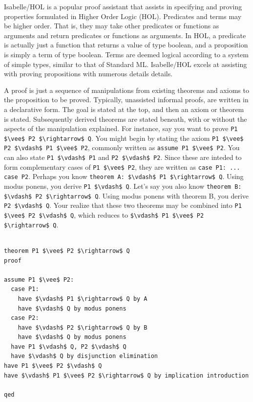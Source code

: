 \documentclass[letterpaper, 11pt]{extarticle}
\begin{document}
Isabelle/HOL is a popular proof assistant that assists in specifying and proving properties
formulated in Higher Order Logic (HOL).  Predicates and terms may be higher order. That is, they
may take other predicates or functions as arguments and return predicates or functions as arguments. 
In HOL, a predicate is actually just a function that returns a value of type boolean, and a proposition
is simply a term of type boolean. Terms are deemed logical according to a system of simple types, similar to
that of Standard ML.  Isabelle/HOL excels at assisting with proving propositions with numerous details details. 

A proof is just a sequence of manipulations from existing theorems and axioms to the proposition to be proved.  
Typically, unassisted informal proofs, are written in a declarative form. The goal is stated at the top,
and then an axiom or theorem is stated. Subsequently derived theorems are stated beneath, with
or without the aspects of the manipulation explained.
For instance, say you want to prove \lstinline[mathescape]{P1 $\vee$ P2 $\rightarrow$ Q}.  You might begin by 
stating the axiom \lstinline[mathescape]{P1 $\vee$ P2 $\vdash$ P1 $\vee$ P2}, commonly written as \lstinline[language=logic]{assume P1 $\vee$ P2}.
You can also state \lstinline[mathescape]{P1 $\vdash$ P1} and \lstinline[mathescape]{P2 $\vdash$ P2}. Since
these are inteded to form complementary cases of \lstinline[mathescape]{P1 $\vee$ P2}, they are written as \lstinline[language=logic]{case P1: ... case P2}.
Perhaps you know \lstinline[language=logic]{theorem A: $\vdash$ P1 $\rightarrow$ Q}. Using modus ponens, you derive \lstinline[mathescape]{P1 $\vdash$ Q}. Let's say
you also know \lstinline[language=logic]{theorem B: $\vdash$ P2 $\rightarrow$ Q}. Using modus ponens with theorem B, you derive \lstinline[mathescape]{P2 $\vdash$ Q}.
Your realize that these two theorems may be combined into \lstinline[mathescape]{P1 $\vee$ P2 $\vdash$ Q}, which reduces to \lstinline[mathescape]{$\vdash$ P1 $\vee$ P2 $\rightarrow$ Q}.


\begin{lstlisting}[language=logic, mathescape]

theorem P1 $\vee$ P2 $\rightarrow$ Q
proof

assume P1 $\vee$ P2:
  case P1:
    have $\vdash$ P1 $\rightarrow$ Q by A
    have $\vdash$ Q by modus ponens
  case P2:
    have $\vdash$ P2 $\rightarrow$ Q by B    
    have $\vdash$ Q by modus ponens
  have P1 $\vdash$ Q, P2 $\vdash$ Q
  have $\vdash$ Q by disjunction elimination
have P1 $\vee$ P2 $\vdash$ Q
have $\vdash$ P1 $\vee$ P2 $\rightarrow$ Q by implication introduction  

qed
  
\end{lstlisting}
\end{document}
